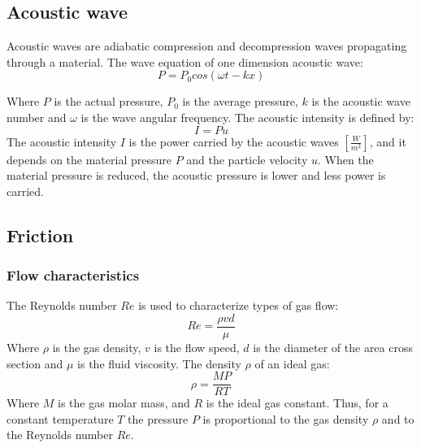 \documentclass[\main/master.tex]{subfiles}
\begin{document}
\subsection{Acoustic wave}
Acoustic waves are adiabatic compression and decompression waves propagating through a material. The wave equation of one dimension acoustic wave:
\begin{equation}
P = P_0 cos(\omega t -k x)       \label{eqn:acoustic_pressure}
\end{equation}
\par\noindent
Where $P$ is the actual pressure, $P_0$ is the average pressure, $k$ is the acoustic wave number and $\omega$ is the wave angular frequency. The acoustic intensity is defined by:
\begin{equation}
I = P u      \label{eqn:acoustic_intensity}
\end{equation} 
The acoustic intensity $I$ is the power carried by the acoustic waves $[\frac{W}{m^2}]$, and it depends on the material pressure $P$ and the particle velocity $u$. When the material pressure is reduced, the acoustic pressure is lower and less power is carried.

\subsection{Friction}
\subsubsection{Flow characteristics}
The Reynolds number $Re$ is used to characterize types of gas flow:
\begin{equation}
Re= \frac{\rho v d}{\mu}     \label{eqn:Reynolds number}
\end{equation}
Where $\rho$ is the gas density, $v$ is the flow speed, $d$ is the diameter of the area cross section and $\mu$ is the fluid viscosity. The density $\rho$ of an ideal gas: 
\begin{equation}
\rho = \frac{MP}{RT}     \label{eqn:ideal density}
\end{equation}
Where $M$ is the gas molar mass, and $R$ is the ideal gas constant. Thus, for a constant temperature $T$ the pressure $P$ is proportional to the gas density $\rho$ and to the Reynolds number $Re$. 
\end{document}
